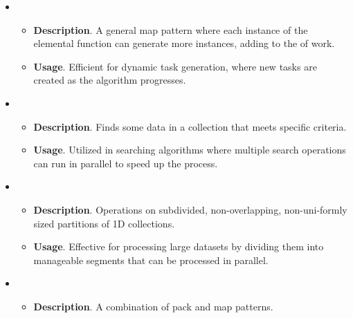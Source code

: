 \begin{itemize}
    \item {}
    \begin{itemize}
        \item[\textcolor{Red2}{\faIcon{book}}] \textcolor{Red2}{\textbf{Description}}. A general map pattern where each instance of the elemental function can generate more instances, adding to the  of work.

        \item[\textcolor{Green3}{\faIcon{question}}] \textcolor{Green3}{\textbf{Usage}}. Efficient for dynamic task generation, where new tasks are created as the algorithm progresses.
    \end{itemize}


    \item {}
    \begin{itemize}
        \item[\textcolor{Red2}{\faIcon{book}}] \textcolor{Red2}{\textbf{Description}}. Finds some data in a collection that meets specific criteria.

        \item[\textcolor{Green3}{\faIcon{question}}] \textcolor{Green3}{\textbf{Usage}}. Utilized in searching algorithms where multiple search operations can run in parallel to speed up the process.
    \end{itemize}


    \item {}
    \begin{itemize}
        \item[\textcolor{Red2}{\faIcon{book}}] \textcolor{Red2}{\textbf{Description}}. Operations on subdivided, non-overlapping, non-uni-\break formly sized partitions of 1D collections.

        \item[\textcolor{Green3}{\faIcon{question}}] \textcolor{Green3}{\textbf{Usage}}. Effective for processing large datasets by dividing them into manageable segments that can be processed in parallel.
    \end{itemize}


    \newpage


    \item {}
    \begin{itemize}
        \item[\textcolor{Red2}{\faIcon{book}}] \textcolor{Red2}{\textbf{Description}}. A combination of pack and map patterns.


\end{itemize}
\end{itemize}
